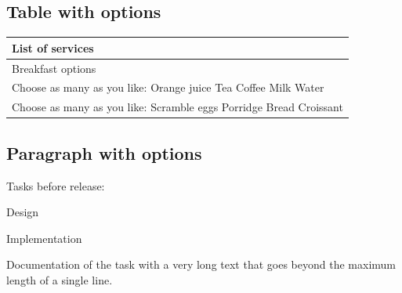 \documentclass[11pt,a4paper]{article}
\begin{document}
\subsection{Table with options}

\begin{table}[h]
\begin{tabular}{|l|}
\hline
\textbf{List of services} \\ \hline
Breakfast options \\ \hline
Choose as many as you like:  Orange juice  Tea  Coffee  Milk  Water \\ \hline
Choose as many as you like:  Scramble eggs  Porridge  Bread  Croissant \\ \hline
\end{tabular}
\end{table}

\subsection{Paragraph with options}

Tasks before release:

Design

Implementation

Documentation of the task with a very long text that goes beyond the maximum length of a single line.
\end{document}
